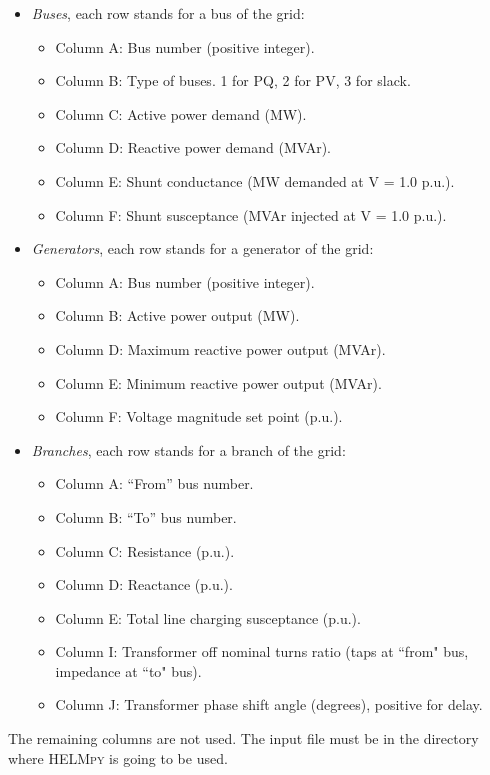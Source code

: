 \documentclass[12pt]{article}
\begin{document}
\begin{itemize}
	\item \textsl{Buses}, each row stands for a bus of the grid:
	\begin{itemize}
		\item Column A: Bus number (positive integer).
		\item Column B: Type of buses. 1 for PQ, 2 for PV, 3 for slack.
		\item Column C: Active power demand (MW).
		\item Column D: Reactive power demand (MVAr).
		\item Column E: Shunt conductance (MW demanded at V = 1.0 p.u.).
		\item Column F: Shunt susceptance (MVAr injected at V = 1.0 p.u.).
	\end{itemize}

	\item \textsl{Generators}, each row stands for a generator of the grid:
	\begin{itemize}
		\item Column A: Bus number (positive integer).
		\item Column B: Active power output (MW).
		\item Column D: Maximum reactive power output (MVAr).
		\item Column E: Minimum reactive power output (MVAr).
		\item Column F: Voltage magnitude set point (p.u.).
	\end{itemize}

	\item \textsl{Branches}, each row stands for a branch of the grid:
	\begin{itemize}
		\item Column A: “From” bus number.
		\item Column B: “To” bus number.
		\item Column C: Resistance (p.u.).
		\item Column D: Reactance (p.u.).
		\item Column E: Total line charging susceptance (p.u.).
		\item Column I: Transformer off nominal turns ratio (taps at “from" bus, impedance at “to" bus).
		\item Column J: Transformer phase shift angle (degrees), positive for delay.
	\end{itemize}
\end{itemize}

The remaining columns are not used. The input file must be in the directory where \textsc{HELMpy} is going to be used.
\end{document}

